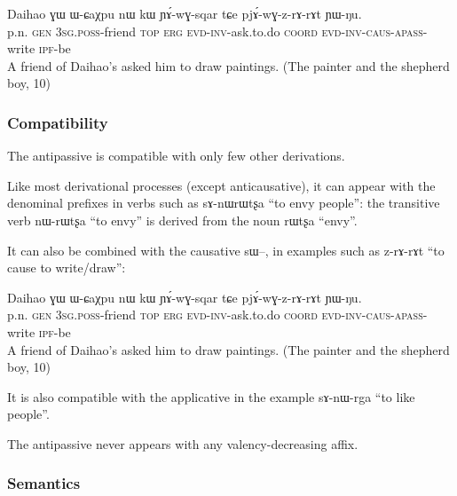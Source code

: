 \documentclass[oldfontcommands,oneside,a4paper,11pt]{memoir}
\newcommand{\ipa}[1]{{\phon #1}} %
\newcommand{\apass}{\textsc{apass}}
\newcommand{\caus}{\textsc{caus}}
\newcommand{\coord}{\textsc{coord}}
\newcommand{\erg}{\textsc{erg}}
\newcommand{\evd}{\textsc{evd}}
\newcommand{\gen}{\textsc{gen}}
\newcommand{\inv}{\textsc{inv}}
\newcommand{\ipf}{\textsc{ipf}}
\newcommand{\poss}{\textsc{poss}}
\newcommand{\sg}{\textsc{sg}}
\newcommand{\topic}{\textsc{top}}
\begin{document}
 \begin{exe}
\ex
\gll  Daihao 	\ipa{ɣɯ} 	\ipa{ɯ-ɕaχpu} 	\ipa{nɯ} 	\ipa{kɯ} 	\ipa{ɲɤ́-wɣ-sqar} 	\ipa{tɕe}  \ipa{pjɤ́-wɣ-z-rɤ-rɤt} 	\ipa{ɲɯ-ŋu.}   \\
  p.n. \gen{} 3\sg{}.\poss{}-friend \topic{} \erg{} \evd{}-\inv{}-ask.to.do \coord{} \evd{}-\inv{}-\caus{}-\apass{}-write \ipf{}-be  \\
 \glt A friend of Daihao's asked him to draw paintings.  (The painter and the shepherd boy, 10)
\end{exe} 

 


\subsubsection{Compatibility} \label{subsub:antipass.compat}
The antipassive is compatible with only few other derivations. 

Like most derivational processes (except anticausative), it can appear with the denominal prefixes in verbs such as \ipa{sɤ-nɯrɯtʂa} ``to envy people'': the transitive verb \ipa{nɯ-rɯtʂa} ``to envy'' is derived from the noun \ipa{rɯtʂa} ``envy''.

It can also be combined with the causative \ipa{sɯ}--, in examples such as \ipa{z-rɤ-rɤt} ``to cause to write/draw'':



 \begin{exe}
\ex
\gll  Daihao 	\ipa{ɣɯ} 	\ipa{ɯ-ɕaχpu} 	\ipa{nɯ} 	\ipa{kɯ} 	\ipa{ɲɤ́-wɣ-sqar} 	\ipa{tɕe}  \ipa{pjɤ́-wɣ-z-rɤ-rɤt} 	\ipa{ɲɯ-ŋu.}   \\
  p.n. \gen{} 3\sg{}.\poss{}-friend \topic{} \erg{} \evd{}-\inv{}-ask.to.do \coord{} \evd{}-\inv{}-\caus{}-\apass{}-write \ipf{}-be  \\
 \glt A friend of Daihao's asked him to draw paintings.  (The painter and the shepherd boy, 10)
\end{exe} 


It is also compatible with the applicative in the example \ipa{sɤ-nɯ-rga} ``to like people''.

The antipassive never appears with any valency-decreasing affix.

\subsubsection{Semantics} \label{subsub:antipass.semantics}
\end{document}
